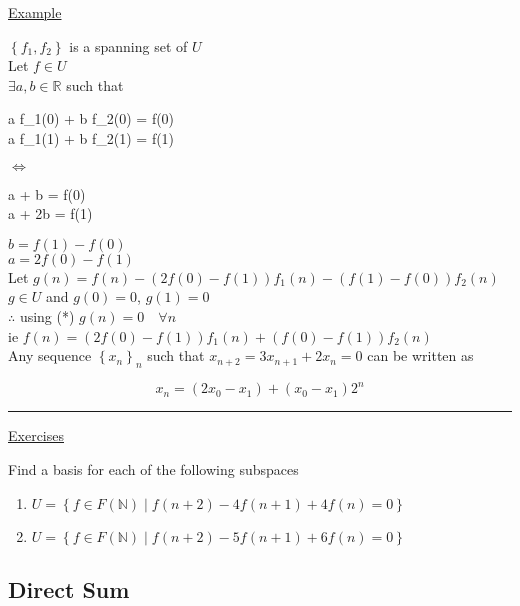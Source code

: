 \documentclass[12pt]{article}
\newcommand{\real}[0]{\mathbb{R}}
\renewcommand{\natural}[0]{\mathbb{N}}
\newenvironment{block}[1][Label]{\underline{#1}\par}{}
\newenvironment{example}{\shownto{-,compact}\underline{Example}\par}{\divider\endshownto}
\newcommand{\bb}[1]{\left\{#1\right\}}
\newcommand{\divider}[0]{\par\textcolor{lightgray}{\rule{\textwidth}{0.1pt}}}
\newenvironment{eqn}{\equation\alignedat{3}}{\endalignedat\endequation}
\begin{document}
\begin{example}
		$\bb{f_1, f_2}$ is a spanning set of $U$ \\
		Let $f \in U$ \\
		$\exists a, b \in \real$ such that
		
		\begin{eqn}
			\begin{cases}
				a f_1(0) + b f_2(0) = f(0) \\
				a f_1(1) + b f_2(1) = f(1)
			\end{cases}
		\end{eqn}
		
		$\Leftrightarrow$
		
		\begin{eqn}
			\begin{cases}
				a + b = f(0) \\
				a + 2b = f(1)
			\end{cases}
		\end{eqn}
		
		$b = f(1) - f(0)$ \\
		$a = 2 f(0) - f(1)$ \\
		Let $g(n) = f(n) - (2f(0) - f(1)) f_1(n) - (f(1) - f(0)) f_2 (n)$ \\
		$g \in U$ and $g(0) = 0$, $g(1) = 0$ \\
		$\therefore$ using (*) $g(n) = 0 \quad \forall n$ \\
		ie $f(n) = (2f(0) - f(1)) f_1 (n) + (f(0) - f(1)) f_2 (n)$ \\
		
		Any sequence $\bb{x_n}_n$ such that $x_{n + 2} = 3x_{n + 1} + 2x_n = 0$ can be written as
		
		$$x_n = (2x_0 - x_1) + (x_0 - x_1) 2^n$$
		
		
	\end{example}
	
	\begin{block}[Exercises]
		Find a basis for each of the following subspaces
		\begin{enumerate}
			\item $U = \bb{f \in F(\natural) \mid f(n + 2) - 4f(n + 1) + 4f(n) = 0}$
			\item $U = \bb{f \in F(\natural) \mid f(n + 2) - 5f(n + 1) + 6f(n) = 0}$
		\end{enumerate}
	\end{block}
	
	\subsection{Direct Sum}
	
\end{document}
